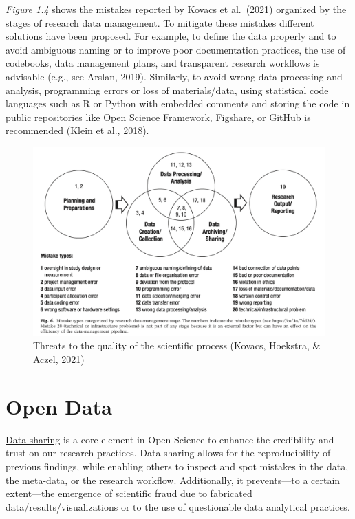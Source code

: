 \documentclass[
]{book}
\theoremstyle{definition}
\theoremstyle{definition}
\theoremstyle{definition}
\theoremstyle{definition}
\theoremstyle{remark}
\begin{document}
\emph{Figure 1.4} shows the mistakes reported by Kovacs et al.~(2021) organized by the stages of research data management. To mitigate these mistakes different solutions have been proposed. For example, to define the data properly and to avoid ambiguous naming or to improve poor documentation practices, the use of codebooks, data management plans, and transparent research workflows is advisable (e.g., see Arslan, 2019). Similarly, to avoid wrong data processing and analysis, programming errors or loss of materials/data, using statistical code languages such as R or Python with embedded comments and storing the code in public repositories like \href{https://osf.io}{Open Science Framework}, \href{https://figshare.com}{Figshare}, or \href{https://github.com}{GitHub} is recommended (Klein et al., 2018).

\begin{figure}

{\centering \includegraphics[width=0.9\linewidth]{./images/fallibility} 

}

\caption{Threats to the quality of the scientific process (Kovacs, Hoekstra, $\&$ Aczel, 2021)}\label{fig:fallibility}
\end{figure}

\hypertarget{open-data}{%
\section{Open Data}\label{open-data}}

\href{https://www.ukrn.org/2021/09/24/new-animated-explainer-on-data-sharing-now-available-to-view-online/}{Data sharing} is a core element in Open Science to enhance the credibility and trust on our research practices. Data sharing allows for the reproducibility of previous findings, while enabling others to inspect and spot mistakes in the data, the meta-data, or the research workflow. Additionally, it prevents---to a certain extent---the emergence of scientific fraud due to fabricated data/results/visualizations or to the use of questionable data analytical practices.
\end{document}
